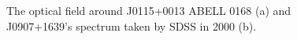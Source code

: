 \begin{figure}[h]
    \centering
    \qquad
    \caption{The optical field around J0115+0013 ABELL 0168 (a) and J0907+1639's spectrum taken by SDSS in 2000 (b). }%
    \label{fig:example}%
\end{figure}






